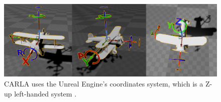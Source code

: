 \begin{figure}[ht]
    \centering
    \includegraphics[width=1.0\textwidth]{figures/carla-coordinates-system.jpeg}
    \caption[Overview of CARLA's coordinates system]{CARLA uses the Unreal Engine's coordinates system, which is a Z-up left-handed system \cite{carla-coordinates-system}.}
    \label{fig:carla-coordinates-system}
\end{figure}
